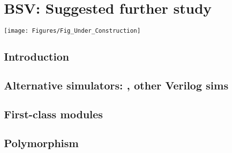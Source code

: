 

\chapter{BSV: Suggested further study}


\setcounter{page}{1}
\renewcommand{\thepage}{\arabic{chapter}-\arabic{page}}

\label{ch_BSV_further_study}


\vspace{2ex}

\centerline{\texttt{[image: Figures/Fig\_Under\_Construction]}}

\vspace{2ex}


\section{Introduction}


\section{Alternative simulators: {\BLUESIM}, other Verilog sims}


\section{First-class modules}


\section{Polymorphism}



